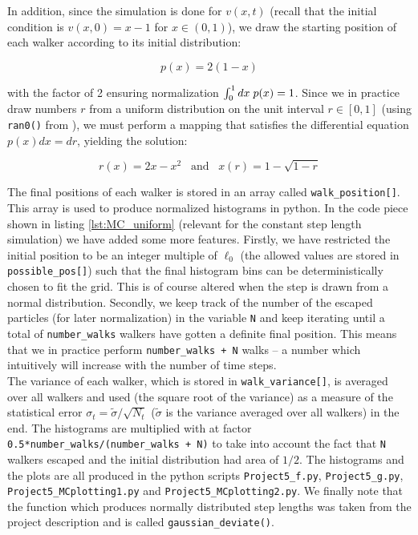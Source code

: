 \documentclass[a4paper, 11pt, notitlepage,english]{article}
\begin{document}
In addition, since the simulation is done for $v(x,t)$ (recall that the initial condition is $v(x,0) = x-1$ for $x\in (0,1)$), we draw the starting position of each walker according to its initial distribution:

\begin{equation}
p(x) = 2(1-x)
\label{eq:MC_initial_dist}
\end{equation}

with the factor of 2 ensuring normalization $\int_0^1 dx \hspace{1mm} p(x) = 1$. Since we in practice draw numbers $r$ from a uniform distribution on the unit interval $r \in [0,1]$ (using \texttt{ran0()} from \cite{Komp3150}), we must perform a mapping that satisfies the differential equation $p(x)dx = dr$, yielding the solution:

\begin{equation}
r(x) = 2x-x^2 \hspace{10pt} \mathrm{and} \hspace{10pt} x(r) = 1 - \sqrt{1-r}
\label{eq:MC_prob_mapping}
\end{equation}

The final positions of each walker is stored in an array called \texttt{walk\_position[]}. This array is used to produce normalized histograms in python. In the code piece shown in listing \ref{lst:MC_uniform} (relevant for the constant step length simulation) we have added some more features. Firstly, we have restricted the initial position to be an integer multiple of $\ell_0$ (the allowed values are stored in \texttt{possible\_pos[]}) such that the final histogram bins can be deterministically chosen to fit the grid. This is of course altered when the step is drawn from a normal distribution. Secondly, we keep track of the number of the escaped particles (for later normalization) in the variable \texttt{N} and keep iterating until a total of \texttt{number\_walks} walkers have gotten a definite final position. This means that we in practice perform \texttt{number\_walks + N} walks – a number which intuitively will increase with the number of time steps. \\

The variance of each walker, which is stored in \texttt{walk\_variance[]}, is averaged over all walkers and used (the square root of the variance) as a measure of the statistical error $\sigma_t = \tilde{\sigma}/\sqrt{N_t}$ ($\tilde{\sigma}$ is the variance averaged over all walkers) in the end. The histograms are multiplied with at factor \texttt{0.5*number\_walks/(number\_walks + N)} to take into account the fact that \texttt{N} walkers escaped and the initial distribution had area of $1/2$. The histograms and the plots are all produced in the python scripts \texttt{Project5\_f.py}, \texttt{Project5\_g.py}, \texttt{Project5\_MCplotting1.py} and \texttt{Project5\_MCplotting2.py}. We finally note that the function which produces normally distributed step lengths was taken from the project description \cite{Komp3150} and is called \texttt{gaussian\_deviate()}.  \\
\end{document}
